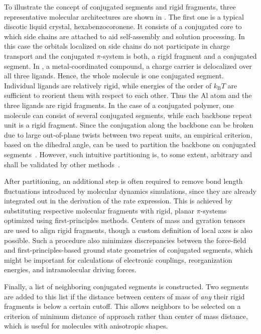To illustrate the concept of conjugated segments and rigid fragments, three representative molecular architectures are shown in . The first one is a typical discotic liquid crystal, hexabenzocoronene. It consists of a conjugated core to which side chains are attached to aid self-assembly and solution processing. In this case the orbitals localized on side chains do not participate in charge transport and the conjugated $\pi$-system is both, a rigid fragment and a conjugated segment. 
%
In \Alq, a metal-coordinated compound, a charge carrier is delocalized over all three ligands. Hence, the whole molecule is one conjugated segment. Individual ligands are relatively rigid, while energies of the order of $k_\text{B}T$ are sufficient to reorient them with respect to each other. Thus the Al atom and the three ligands are rigid fragments.
%
In the case of a conjugated polymer, one molecule can consist of several conjugated segments, while each backbone repeat unit is a rigid fragment. Since the conjugation along the backbone can be broken due to large out-of-plane twists between two repeat units, an empirical criterion, based on the dihedral angle, can be used to partition the backbone on conjugated segments~\cite{ruehle_multiscale_2010}. However, such intuitive partitioning is, to some extent, arbitrary and shall be validated by other methods~\cite{vukmirovi_charge_2008,vukmirovi_charge_2009,mcmahon_ad_2009}. 

After partitioning, an additional step is often required to remove bond length fluctuations introduced by molecular dynamics simulations, since they are already integrated out in the derivation of the rate expression. This is achieved by substituting respective molecular fragments with  rigid, planar $\pi$-systems optimized using first-principles methods. Centers of mass and gyration tensors are used to align rigid fragments, though a custom definition of local axes is also possible. Such a procedure also minimizes discrepancies between the force-field and first-principles-based ground state geometries of conjugated segments, which might be important for calculations of electronic couplings, reorganization energies, and intramolecular driving forces. 

Finally, a list of neighboring conjugated segments is constructed. Two segments are added to this list if the distance between centers of mass of {\em any} their rigid fragments is below a certain cutoff. This allows neighbors to be selected on a criterion of minimum distance of approach rather than center of mass distance, which is useful for molecules with anisotropic shapes.
